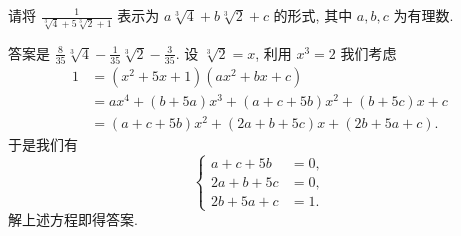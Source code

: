 \begin{prob}
\label{prob:prob-4}
请将 $\frac{1}{\sqrt[3]{4} + 5\sqrt[3]{2} + 1}$
表示为 $a\sqrt[3]{4} + b\sqrt[3]{2} + c$ 的形式,
其中 $a, b, c$ 为有理数.
\end{prob}

\begin{soln}
答案是 $\boxed{\tfrac{8}{35}\sqrt[3]{4} - \tfrac{1}{35}\sqrt[3]{2} - \tfrac{3}{35}.}$
设 $\sqrt[3]{2} = x$, 利用 $x^3 = 2$ 我们考虑
\begin{align*}
1 &= (x^2 + 5x + 1)(ax^2 + bx + c) \\
  &= ax^4 + (b+5a)x^3 + (a+c+5b)x^2 + (b+5c)x + c \\
  &= (a+c+5b)x^2 + (2a+b+5c)x + (2b+5a+c).
\end{align*}
于是我们有
\[
\begin{cases}
a  + c  + 5b &= 0,\\
2a + b  + 5c &= 0,\\
2b + 5a + c  &= 1.
\end{cases}
\]
解上述方程即得答案.
\end{soln}
